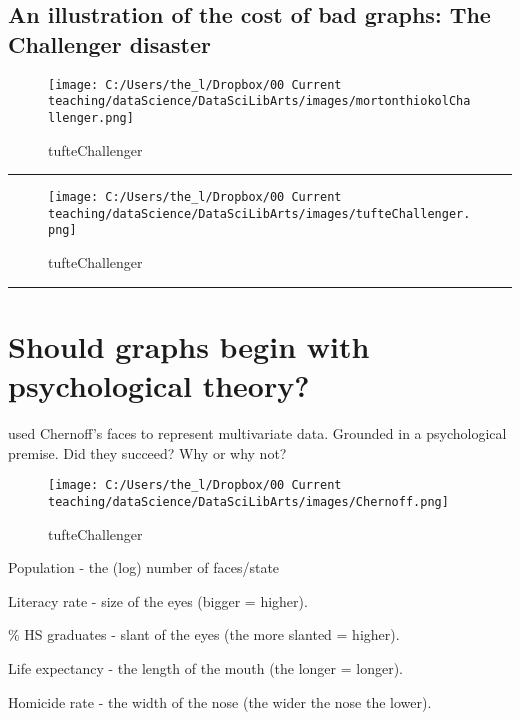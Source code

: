\documentclass[]{book}
\theoremstyle{definition}
\theoremstyle{definition}
\theoremstyle{definition}
\theoremstyle{remark}
\begin{document}
\subsection{An illustration of the cost of bad graphs: The Challenger
disaster}\label{an-illustration-of-the-cost-of-bad-graphs-the-challenger-disaster}

\begin{figure}
\centering
\texttt{[image: C:/Users/the\_l/Dropbox/00 Current teaching/dataScience/DataSciLibArts/images/mortonthiokolChallenger.png]}
\caption{tufteChallenger}
\end{figure}

\begin{center}\rule{0.5\linewidth}{\linethickness}\end{center}

\begin{figure}
\centering
\texttt{[image: C:/Users/the\_l/Dropbox/00 Current teaching/dataScience/DataSciLibArts/images/tufteChallenger.png]}
\caption{tufteChallenger}
\end{figure}

\begin{center}\rule{0.5\linewidth}{\linethickness}\end{center}

\section{Should graphs begin with psychological
theory?}\label{should-graphs-begin-with-psychological-theory}

\citet{wainer1981graphical} used Chernoff's faces to represent
multivariate data. Grounded in a psychological premise. Did they
succeed? Why or why not?

\begin{figure}
\centering
\texttt{[image: C:/Users/the\_l/Dropbox/00 Current teaching/dataScience/DataSciLibArts/images/Chernoff.png]}
\caption{tufteChallenger}
\end{figure}

Population - the (log) number of faces/state

Literacy rate - size of the eyes (bigger = higher).

\% HS graduates - slant of the eyes (the more slanted = higher).

Life expectancy - the length of the mouth (the longer = longer).

Homicide rate - the width of the nose (the wider the nose the lower).
\end{document}
